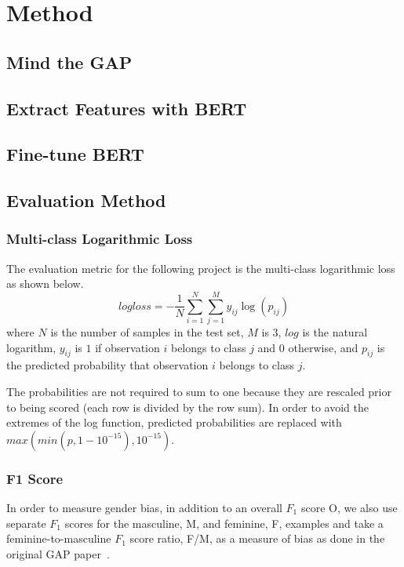 \chapter{Method}


\section{Mind the GAP}
\section{Extract Features with BERT}

\section{Fine-tune BERT}

\section{Evaluation Method}

\subsection{Multi-class Logarithmic Loss}

The evaluation metric for the following project is the multi-class logarithmic loss as shown below.
\begin{equation}
	logloss=-\frac{1}{N} \sum_{i=1}^{N} \sum_{j=1}^{M} y_{i j} \log \left(p_{i j}\right)
\end{equation}
where $N$ is the number of samples in the test set, $M$ is $3$,  $log$ is the natural logarithm, $y_{i j}$ is $1$ if observation $i$ belongs to class $j$ and $0$ otherwise, and $p_{i j}$ is the predicted probability that observation $i$ belongs to class $j$.

The probabilities are not required to sum to one because they are rescaled prior to being scored (each row is divided by the row sum). In order to avoid the extremes of the log function, predicted probabilities are replaced with $max(min(p, 1-10^{-15}), 10^{-15})$.

\subsection{F1 Score}
In order to measure gender bias, in addition to an overall $F_1$ score O, we also use separate $F_1$ scores for the masculine, M, and feminine, F, examples and take a feminine-to-masculine $F_1$ score ratio, F/M, as a measure of bias as done in the original GAP paper~.